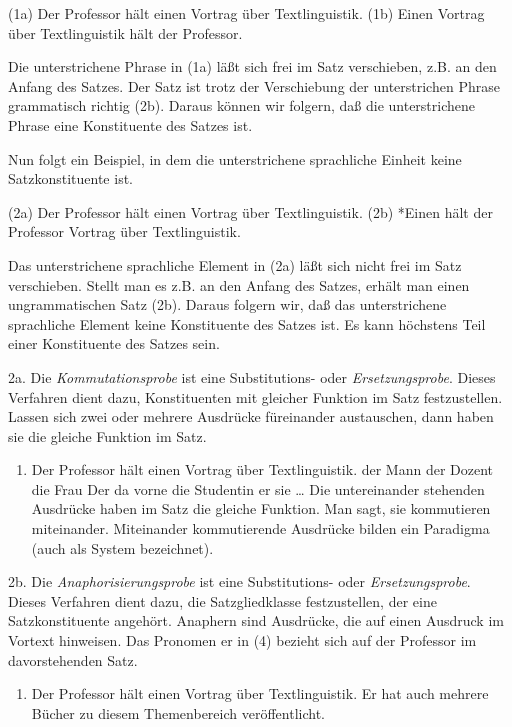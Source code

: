 \documentclass[
]{article}
\providecommand{\tightlist}{%
  \setlength{\itemsep}{0pt}\setlength{\parskip}{0pt}}
\begin{document}
(1a) Der Professor hält einen Vortrag über Textlinguistik.
(1b) Einen Vortrag über Textlinguistik hält der Professor.

Die unterstrichene Phrase in (1a) läßt sich frei im Satz verschieben, z.B. an den Anfang des Satzes. Der Satz ist trotz der Verschiebung der unterstrichen Phrase grammatisch richtig (2b). Daraus können wir folgern, daß die unterstrichene Phrase eine Konstituente des Satzes ist.

Nun folgt ein Beispiel, in dem die unterstrichene sprachliche Einheit keine Satzkonstituente ist.

(2a) Der Professor hält einen Vortrag über Textlinguistik.
(2b) *Einen hält der Professor Vortrag über Textlinguistik.

Das unterstrichene sprachliche Element in (2a) läßt sich nicht frei im Satz verschieben. Stellt man es z.B. an den Anfang des Satzes, erhält man einen ungrammatischen Satz (2b). Daraus folgern wir, daß das unterstrichene sprachliche Element keine Konstituente des Satzes ist. Es kann höchstens Teil einer Konstituente des Satzes sein.

2a. Die \emph{Kommutationsprobe} ist eine Substitutions- oder \emph{Ersetzungsprobe}. Dieses Verfahren dient dazu, Konstituenten mit gleicher Funktion im Satz festzustellen. Lassen sich zwei oder mehrere Ausdrücke füreinander austauschen, dann haben sie die gleiche Funktion im Satz.

\begin{enumerate}
\def\labelenumi{(\arabic{enumi})}
\setcounter{enumi}{2}
\tightlist
\item
  Der Professor hält einen Vortrag über Textlinguistik.
  der Mann
  der Dozent
  die Frau
  Der da vorne
  die Studentin
  er
  sie
  \ldots{}
  Die untereinander stehenden Ausdrücke haben im Satz die gleiche Funktion. Man sagt, sie kommutieren miteinander. Miteinander kommutierende Ausdrücke bilden ein Paradigma (auch als System bezeichnet).
\end{enumerate}

2b. Die \emph{Anaphorisierungsprobe} ist eine Substitutions- oder \emph{Ersetzungsprobe}. Dieses Verfahren dient dazu, die Satzgliedklasse festzustellen, der eine Satzkonstituente angehört. Anaphern sind Ausdrücke, die auf einen Ausdruck im Vortext hinweisen. Das Pronomen er in (4) bezieht sich auf der Professor im davorstehenden Satz.

\begin{enumerate}
\def\labelenumi{(\arabic{enumi})}
\setcounter{enumi}{3}
\tightlist
\item
  Der Professor hält einen Vortrag über Textlinguistik. Er hat auch mehrere Bücher zu diesem Themenbereich veröffentlicht.
\end{enumerate}
\end{document}
